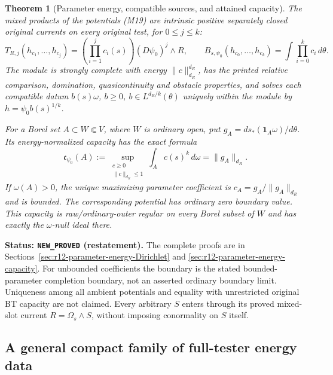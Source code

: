 \documentclass[11pt,a4paper]{article}
\numberwithin{equation}{section}
\newtheorem{theorem}{Theorem}[section]
\theoremstyle{definition}
\theoremstyle{remark}
\begin{document}
\begin{theorem}[Parameter energy, compatible sources, and attained capacity]
\label{thm:r12-main-parameter-module}
The mixed products of the potentials (M19) are intrinsic positive
separately closed original currents on every original test, for
$0\leq j\leq k$:
\[
 T_{R,j}(h_{c_1},\ldots,h_{c_j})
    =\left(\prod_{i=1}^j c_i(s)\right)(D\psi_0)^j\wedge R,
 \qquad
 B_{s,\psi_0}(h_{c_0},\ldots,h_{c_k})
    =\int\prod_{i=0}^k c_i\,d\theta.
 \tag{M20}
\]
The module is strongly complete with energy $\|c\|_{d_R}^{d_R}$,
has the printed relative comparison, domination, quasicontinuity
and obstacle properties, and solves each compatible datum
$b(s)\omega$, $b\geq0$, $b\in L^{d_R/k}(\theta)$ uniquely within
the module by $h=\psi_0b(s)^{1/k}$.

For a Borel set $A\subset W\Subset V$, where $W$ is ordinary open,
put $g_A=d s_*(\mathbf1_A\omega)/d\theta$. Its energy-normalized
capacity has the exact formula
\[
 \mathfrak c_{\psi_0}(A)
    :=\sup_{\substack{c\geq0\\\|c\|_{d_R}\leq1}}
               \int_A c(s)^k\,d\omega
     =\|g_A\|_{d_R}.
 \tag{M21}
\]
If $\omega(A)>0$, the unique maximizing parameter coefficient is
$c_A=g_A/\|g_A\|_{d_R}$ and is bounded. The corresponding
potential has ordinary zero boundary value. This capacity is
raw/ordinary-outer regular on every Borel subset of $W$ and has
exactly the $\omega$-null ideal there.
\end{theorem}

\noindent\textbf{Status: \texttt{NEW\_PROVED} (restatement).}
The complete proofs are in
Sections~\ref{sec:r12-parameter-energy-Dirichlet} and
\ref{sec:r12-parameter-energy-capacity}.
For unbounded coefficients the boundary is the stated
bounded-parameter completion boundary, not an asserted ordinary
boundary limit. Uniqueness among all ambient potentials and
equality with unrestricted original BT capacity are not claimed.
Every arbitrary $S$ enters through its proved mixed-slot current
$R=\Omega_s\wedge S$, without imposing conormality on $S$ itself.

\subsection{A general compact family of full-tester energy data}
\end{document}
